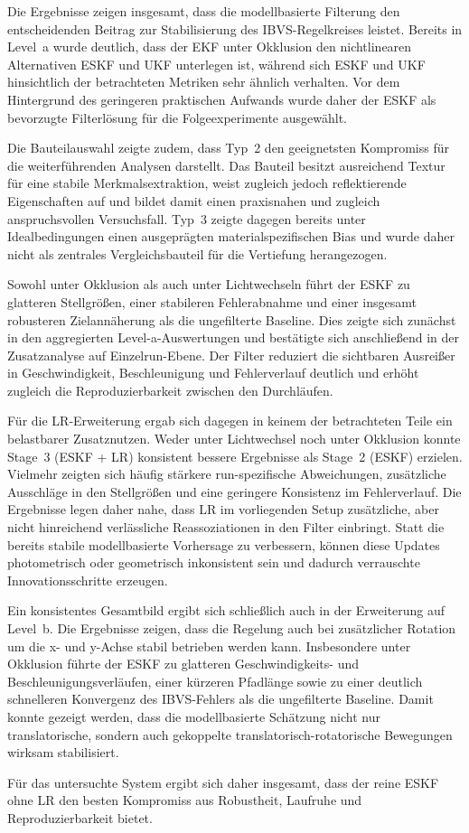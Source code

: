 Die Ergebnisse zeigen insgesamt, dass die modellbasierte Filterung den entscheidenden Beitrag zur Stabilisierung des \ac{IBVS}-Regelkreises leistet. Bereits in Level~a wurde deutlich, dass der \ac{EKF} unter Okklusion den nichtlinearen Alternativen \ac{ESKF} und \ac{UKF} unterlegen ist, während sich \ac{ESKF} und \ac{UKF} hinsichtlich der betrachteten Metriken sehr ähnlich verhalten. Vor dem Hintergrund des geringeren praktischen Aufwands wurde daher der \ac{ESKF} als bevorzugte Filterlösung für die Folgeexperimente ausgewählt.

Die Bauteilauswahl zeigte zudem, dass Typ~2 den geeignetsten Kompromiss für die weiterführenden Analysen darstellt. Das Bauteil besitzt ausreichend Textur für eine stabile Merkmalsextraktion, weist zugleich jedoch reflektierende Eigenschaften auf und bildet damit einen praxisnahen und zugleich anspruchsvollen Versuchsfall. Typ~3 zeigte dagegen bereits unter Idealbedingungen einen ausgeprägten materialspezifischen Bias und wurde daher nicht als zentrales Vergleichsbauteil für die Vertiefung herangezogen.

Sowohl unter Okklusion als auch unter Lichtwechseln führt der \ac{ESKF} zu glatteren Stellgrößen, einer stabileren Fehlerabnahme und einer insgesamt robusteren Zielannäherung als die ungefilterte Baseline. Dies zeigte sich zunächst in den aggregierten Level-a-Auswertungen und bestätigte sich anschließend in der Zusatzanalyse auf Einzelrun-Ebene. Der Filter reduziert die sichtbaren Ausreißer in Geschwindigkeit, Beschleunigung und Fehlerverlauf deutlich und erhöht zugleich die Reproduzierbarkeit zwischen den Durchläufen.

Für die \ac{LR}-Erweiterung ergab sich dagegen in keinem der betrachteten Teile ein belastbarer Zusatznutzen. Weder unter Lichtwechsel noch unter Okklusion konnte Stage~3 (ESKF + LR) konsistent bessere Ergebnisse als Stage~2 (ESKF) erzielen. Vielmehr zeigten sich häufig stärkere run-spezifische Abweichungen, zusätzliche Ausschläge in den Stellgrößen und eine geringere Konsistenz im Fehlerverlauf. Die Ergebnisse legen daher nahe, dass \ac{LR} im vorliegenden Setup zusätzliche, aber nicht hinreichend verlässliche Reassoziationen in den Filter einbringt. Statt die bereits stabile modellbasierte Vorhersage zu verbessern, können diese Updates photometrisch oder geometrisch inkonsistent sein und dadurch verrauschte Innovationsschritte erzeugen.

Ein konsistentes Gesamtbild ergibt sich schließlich auch in der Erweiterung auf Level~b. Die Ergebnisse zeigen, dass die Regelung auch bei zusätzlicher Rotation um die x- und y-Achse stabil betrieben werden kann. Insbesondere unter Okklusion führte der \ac{ESKF} zu glatteren Geschwindigkeits- und Beschleunigungsverläufen, einer kürzeren Pfadlänge sowie zu einer deutlich schnelleren Konvergenz des \ac{IBVS}-Fehlers als die ungefilterte Baseline. Damit konnte gezeigt werden, dass die modellbasierte Schätzung nicht nur translatorische, sondern auch gekoppelte translatorisch-rotatorische Bewegungen wirksam stabilisiert.

Für das untersuchte System ergibt sich daher insgesamt, dass der reine \ac{ESKF} ohne \ac{LR} den besten Kompromiss aus Robustheit, Laufruhe und Reproduzierbarkeit bietet.
